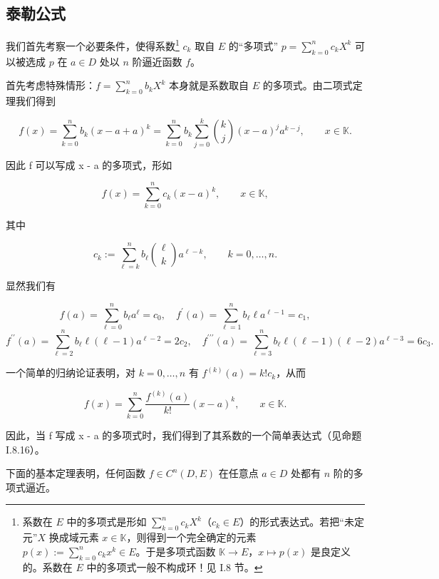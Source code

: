 \subsection*{泰勒公式}

我们首先考察一个必要条件，使得系数\footnote{系数在 $ E $ 中的多项式是形如 $ \sum_{k=0}^{n} c_k X^k $（$ c_k \in E $）的形式表达式。若把“未定元”$ X $ 换成域元素 $ x \in \mathbb{K} $，则得到一个完全确定的元素 $ p(x) := \sum_{k=0}^{n} c_k x^k \in E $。于是多项式函数 $ \mathbb{K} \to E $，$ x \mapsto p(x) $ 是良定义的。系数在 $ E $ 中的多项式一般不构成环！见 I.8 节。} $ c_k $ 取自 $ E $ 的“多项式” $ p = \sum_{k=0}^{n} c_k X^k $ 可以被选成 $ p $ 在 $ a \in D $ 处以 $ n $ 阶逼近函数 $ f $。

首先考虑特殊情形：$ f = \sum_{k=0}^{n} b_k X^k $ 本身就是系数取自 $ E $ 的多项式。由二项式定理我们得到

\[
f(x)=\sum_{k=0}^{n}b_{k}(x-a+a)^{k}=\sum_{k=0}^{n}b_{k}\sum_{j=0}^{k}\binom{k}{j}(x-a)^{j}a^{k-j},\qquad x\in\mathbb{K}.
\]

因此 f 可以写成 x - a 的多项式，形如

\[
f(x)=\sum_{k=0}^{n}c_{k}(x-a)^{k},\qquad x\in\mathbb{K},
\]

其中

\[
c_{k}:=\sum_{\ell=k}^{n}b_{\ell}\binom{\ell}{k}a^{\ell-k},\qquad k=0,\ldots,n.
\]

显然我们有

\[
f(a)=\sum_{\ell=0}^{n}b_{\ell}a^{\ell}=c_{0},\quad f^{\prime}(a)=\sum_{\ell=1}^{n}b_{\ell}\ell a^{\ell-1}=c_{1},
\]
\[
f^{\prime\prime}(a)=\sum_{\ell=2}^{n}b_{\ell}\ell(\ell-1)a^{\ell-2}=2c_{2},\quad f^{\prime\prime\prime}(a)=\sum_{\ell=3}^{n}b_{\ell}\ell(\ell-1)(\ell-2)a^{\ell-3}=6c_{3}.
\]

一个简单的归纳论证表明，对 $ k = 0, \ldots, n $ 有 $ f^{(k)}(a) = k! c_k $，从而

\[
f(x)=\sum_{k=0}^{n}\frac{f^{(k)}(a)}{k!}(x-a)^{k},\qquad x\in\mathbb{K}.
\]

因此，当 f 写成 x - a 的多项式时，我们得到了其系数的一个简单表达式（见命题 I.8.16）。

下面的基本定理表明，任何函数 $ f \in C^n(D, E) $ 在任意点 $ a \in D $ 处都有 $ n $ 阶的多项式逼近。

